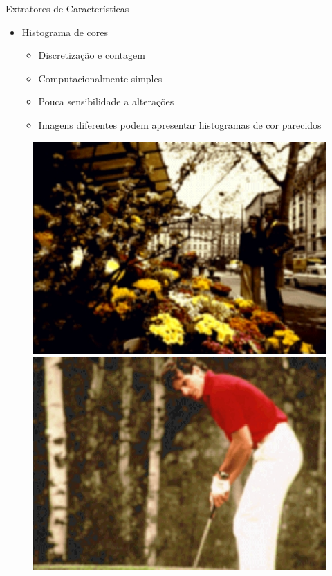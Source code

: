 \documentclass{beamer}
\begin{document}
\begin{frame}{Extratores de Características}
  \begin{itemize}
   \item Histograma de cores
   \begin{itemize}
      \item Discretização e contagem\newline
      \item Computacionalmente simples\newline
      \item Pouca sensibilidade a alterações\newline
      \item Imagens diferentes podem apresentar histogramas de cor parecidos
  \end{itemize} 
 \end{itemize}
	\begin{figure}
\centering
\begin{minipage}{.4\textwidth}
  \centering
  \includegraphics[width=.9\linewidth]{same1.jpg}
\end{minipage}%
\begin{minipage}{.4\textwidth}
  \centering
  \includegraphics[width=.9\linewidth]{same2.jpg}

\end{minipage}
\end{figure}

\end{frame}
\end{document}
